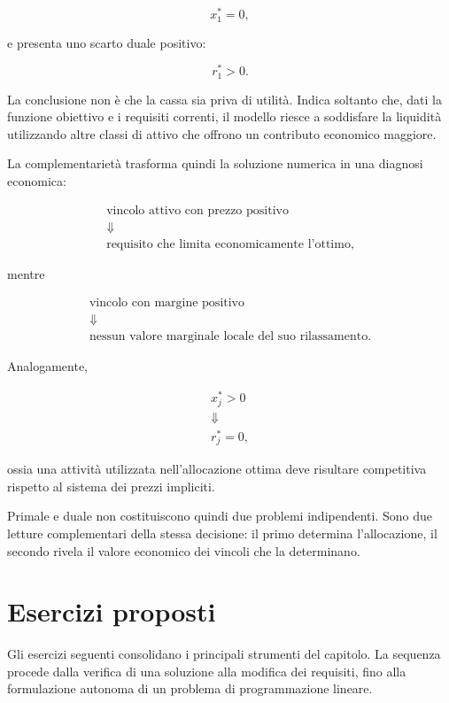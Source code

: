 \begin{enumerate}
\[
x_1^*=0,
\]

e presenta uno scarto duale positivo:

\[
r_1^*>0.
\]

La conclusione non \`e che la cassa sia priva di utilit\`a. Indica soltanto
che, dati la funzione obiettivo e i requisiti correnti, il modello riesce a
soddisfare la liquidit\`a utilizzando altre classi di attivo che offrono un
contributo economico maggiore.

La complementariet\`a trasforma quindi la soluzione numerica in una diagnosi
economica:

\[
\begin{array}{c}
\text{vincolo attivo con prezzo positivo}
\\
\Downarrow
\\
\text{requisito che limita economicamente l'ottimo},
\end{array}
\]

mentre

\[
\begin{array}{c}
\text{vincolo con margine positivo}
\\
\Downarrow
\\
\text{nessun valore marginale locale del suo rilassamento}.
\end{array}
\]

Analogamente,

\[
\begin{array}{c}
x_j^*>0
\\
\Downarrow
\\
r_j^*=0,
\end{array}
\]

ossia una attivit\`a utilizzata nell'allocazione ottima deve risultare
competitiva rispetto al sistema dei prezzi impliciti.

Primale e duale non costituiscono quindi due problemi indipendenti. Sono due
letture complementari della stessa decisione: il primo determina
l'allocazione, il secondo rivela il valore economico dei vincoli che la
determinano.

\end{enumerate}

\section{Esercizi proposti}

\label{sec:cap11-esercizi-proposti}

Gli esercizi seguenti consolidano i principali strumenti del capitolo.
La sequenza procede dalla verifica di una soluzione alla modifica dei
requisiti, fino alla formulazione autonoma di un problema di programmazione
lineare.

